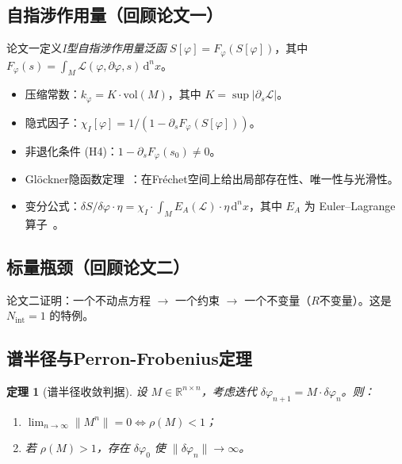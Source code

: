 \documentclass[12pt,a4paper]{article}
\newtheorem{theorem}{定理}[section]
\theoremstyle{definition}
\newcommand{\mL}{\mathcal{L}}
\newcommand{\vol}{\mathrm{vol}}
\newcommand{\R}{\mathbb{R}}
\newcommand{\diff}{\mathrm{d}}
\newcommand{\chiI}{\chi_I}
\newcommand{\EA}{E_A}
\newcommand{\dVol}{\,\diff^n x}
\newcommand{\Nint}{N_{\mathrm{int}}}
\begin{document}
\subsection{自指涉作用量（回顾论文一）}

论文一定义\emph{I型自指涉作用量泛函} $S[\varphi] = F_\varphi(S[\varphi])$，其中 $F_\varphi(s) = \int_M \mL(\varphi, \partial\varphi, s) \dVol$。

\begin{itemize}[leftmargin=*]
\item 压缩常数：$k_\varphi = K \cdot \vol(M)$，其中 $K = \sup|\partial_s \mL|$。
\item 隐式因子：$\chiI[\varphi] = 1/(1 - \partial_s F_\varphi(S[\varphi]))$。
\item 非退化条件 (H4)：$1 - \partial_s F_\varphi(s_0) \neq 0$。
\item Glöckner隐函数定理~\cite{Glockner2006}：在Fréchet空间上给出局部存在性、唯一性与光滑性。
\item 变分公式：$\delta S / \delta\varphi \cdot \eta = \chiI \cdot \int_M \EA(\mL) \cdot \eta \dVol$，其中 $\EA$ 为 Euler--Lagrange 算子~\cite{Olver1993}。
\end{itemize}

\subsection{标量瓶颈（回顾论文二）}

论文二证明：一个不动点方程 $\to$ 一个约束 $\to$ 一个不变量（$R$不变量）。这是 $\Nint = 1$ 的特例。

\subsection{谱半径与Perron-Frobenius定理}

\begin{theorem}[谱半径收敛判据]
\label{thm:spectral}
设 $M \in \R^{n \times n}$，考虑迭代 $\delta\varphi_{n+1} = M \cdot \delta\varphi_n$。则：
\begin{enumerate}[label=(\alph*)]
\item $\lim_{n\to\infty} \|M^n\| = 0 \iff \rho(M) < 1$；
\item 若 $\rho(M) > 1$，存在 $\delta\varphi_0$ 使 $\|\delta\varphi_n\| \to \infty$。
\end{enumerate}
\end{theorem}
\end{document}
